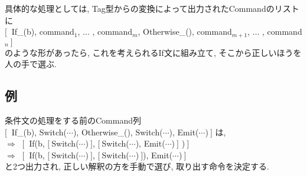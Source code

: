 \documentclass[uplatex,a4j]{jsreport}
\begin{document}
具体的な処理としては, 
Tag型からの変換によって出力されたCommandのリストに \\
$[\ $ If_(b), command$_1$, $\ldots$ , command$_m$, Otherwise_(), command$_{m+1}$, $\ldots$ , command$_n \ ]$\\
のような形があったら, これを考えられるIf文に組み立て, そこから正しいほうを人の手で選ぶ. 
\subsection*{例}
条件文の処理をする前のCommand列\\
$[\ $ If_(b), Switch($\cdots$), Otherwise_(), Switch($\cdots$), Emit($\cdots$)$ \ ]$
は, \\
$\Rightarrow\ $ $[\ $ If(b, $[\ $Switch($\cdots$)$ \ ]$, $[\ $Switch($\cdots$), Emit($\cdots$)$ \ ]$ )$\ ]$\\
$\Rightarrow\ $ $[\ $ If(b, $[\ $Switch($\cdots$)$ \ ]$, $[\ $Switch($\cdots$)$ \ ]$), Emit($\cdots$)$ \ ]$ \\
と2つ出力され, 正しい解釈の方を手動で選び, 取り出す命令を決定する.
\end{document}
